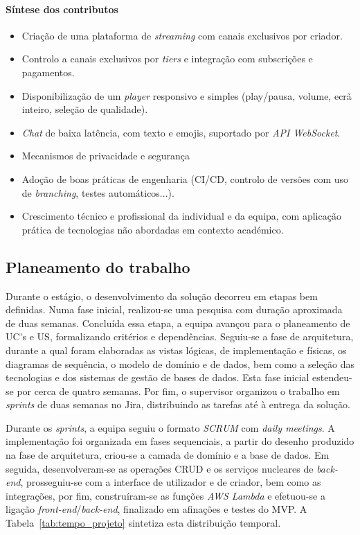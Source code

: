 \paragraph{Síntese dos contributos}
\begin{itemize}
    \item Criação de uma plataforma de \textit{streaming} com canais exclusivos por criador.
    \item Controlo a canais exclusivos por \textit{tiers} e integração com subscrições e pagamentos.
    \item Disponibilização de um \textit{player} responsivo e simples (play/pausa, volume, ecrã inteiro, seleção de qualidade).
    \item \textit{Chat} de baixa latência, com texto e emojis, suportado por \textit{API WebSocket}.
    \item Mecanismos de privacidade e segurança
    \item Adoção de boas práticas de engenharia (\gls{CI/CD}, controlo de versões com uso de \textit{branching}, testes automáticos...).
    \item Crescimento técnico e profissional da individual e da equipa, com aplicação prática de tecnologias não abordadas em contexto académico.
\end{itemize}


\subsection{Planeamento do trabalho}  

Durante o estágio, o desenvolvimento da solução decorreu em etapas bem definidas. Numa fase inicial, realizou-se uma pesquisa com duração aproximada de duas semanas. Concluída essa etapa, a equipa avançou para o planeamento de \gls{UC's} e \gls{US}, formalizando critérios e dependências. Seguiu-se a fase de arquitetura, durante a qual foram elaboradas as vistas lógicas, de implementação e físicas, os diagramas de sequência, o modelo de domínio e de dados, bem como a seleção das tecnologias e dos sistemas de gestão de bases de dados. Esta fase inicial estendeu-se por cerca de quatro semanas. Por fim, o supervisor organizou o trabalho em \textit{sprints} de duas semanas no Jira, distribuindo as tarefas até à entrega da solução.

Durante os \textit{sprints}, a equipa seguiu o formato \textit{SCRUM} com \textit{daily meetings}. A implementação foi organizada em fases sequenciais, a partir do desenho produzido na fase de arquitetura, criou-se a camada de domínio e a base de dados. Em seguida, desenvolveram-se as operações \gls{CRUD} e os serviços nucleares de \textit{back-end}, prosseguiu-se com a interface de utilizador e de criador, bem como as integrações, por fim, construíram-se as funções \textit{AWS Lambda} e efetuou-se a ligação \textit{front-end}/\textit{back-end}, finalizado em afinações e testes do \gls{MVP}. A Tabela~\ref{tab:tempo_projeto} sintetiza esta distribuição temporal.


